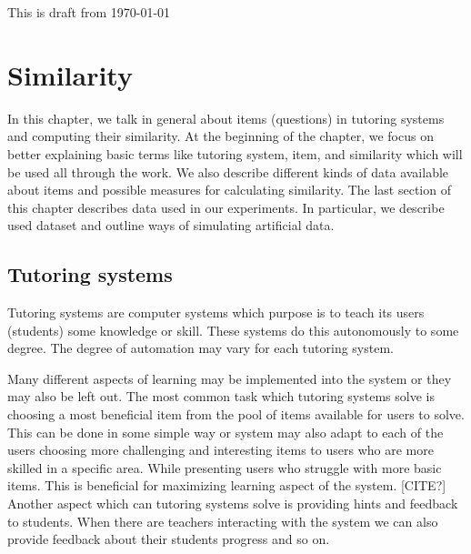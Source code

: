 \documentclass[
  digital, %
  table,   %
  nolof,     %
  nolot,     %
  nocover,
  color
]{fithesis3}
\begin{document}
This is draft from \today %

\chapter{Similarity}



In this chapter, we talk in general about items (questions) in tutoring systems and computing their similarity. At the beginning of the chapter, we focus on better explaining basic terms like tutoring system, item, and similarity which will be used all through the work. We also describe different kinds of data available about items and possible measures for calculating similarity.
The last section of this chapter describes data used in our experiments. In particular, we describe used dataset and outline ways of simulating artificial data.


\section{Tutoring systems}\label{tutoring-systems}

Tutoring systems are computer systems which purpose is to teach its users (students) some knowledge or skill. These systems do this autonomously to some degree. The degree of automation may vary for each tutoring system.


Many different aspects of learning may be implemented into the system or they may also be left out. The most common task which tutoring systems solve is choosing a most beneficial item from the pool of items available for users to solve. This can be done in some simple way or system may also adapt to each of the users choosing more challenging and interesting items to users who are more skilled in a specific area. While presenting users who struggle with more basic items. This is beneficial for maximizing learning aspect of the system. [CITE?] Another aspect which can tutoring systems solve is providing hints and feedback to students. When there are teachers interacting with the system we can also provide feedback about their students progress and so on.

\end{document}
